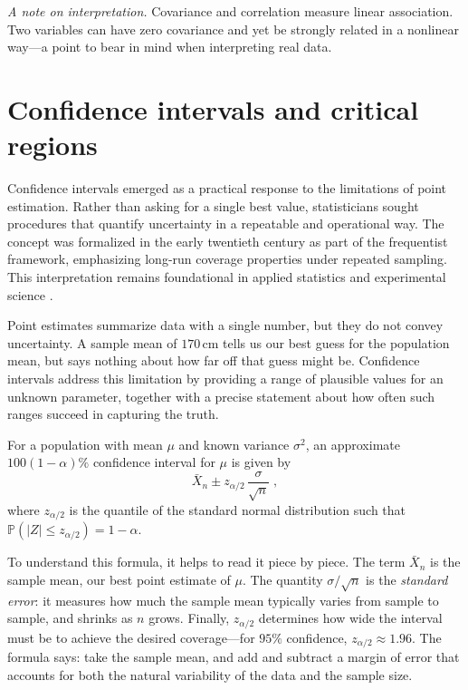 \medskip

\textit{A note on interpretation.} Covariance and correlation measure linear association. Two variables can have zero covariance and yet be strongly related in a nonlinear way---a point to bear in mind when interpreting real data.

\section{Confidence intervals and critical regions}

Confidence intervals emerged as a practical response to the limitations of point estimation. Rather than asking for a single best value, statisticians sought procedures that quantify uncertainty in a repeatable and operational way. The concept was formalized in the early twentieth century as part of the frequentist framework, emphasizing long-run coverage properties under repeated sampling. This interpretation remains foundational in applied statistics and experimental science \cite{degroot_2012_probability, bandyopadhyay_2011_philosophy}.

\medskip

Point estimates summarize data with a single number, but they do not convey uncertainty. A sample mean of $170\,\text{cm}$ tells us our best guess for the population mean, but says nothing about how far off that guess might be. Confidence intervals address this limitation by providing a range of plausible values for an unknown parameter, together with a precise statement about how often such ranges succeed in capturing the truth.

\medskip

For a population with mean $\mu$ and known variance $\sigma^2$, an approximate $100(1-\alpha)\%$ confidence interval for $\mu$ is given by
\begin{equation}
    \bar{X}_n \pm z_{\alpha/2}\,\frac{\sigma}{\sqrt{n}} \; ,
    \label{eq:ci}
\end{equation}
where $z_{\alpha/2}$ is the quantile of the standard normal distribution such that $\mathbb{P}(|Z| \leq z_{\alpha/2}) = 1 - \alpha$.

\medskip

To understand this formula, it helps to read it piece by piece. The term $\bar{X}_n$ is the sample mean, our best point estimate of $\mu$. The quantity $\sigma/\sqrt{n}$ is the \textit{standard error}: it measures how much the sample mean typically varies from sample to sample, and shrinks as $n$ grows. Finally, $z_{\alpha/2}$ determines how wide the interval must be to achieve the desired coverage---for $95\%$ confidence, $z_{\alpha/2} \approx 1.96$. The formula says: take the sample mean, and add and subtract a margin of error that accounts for both the natural variability of the data and the sample size.


